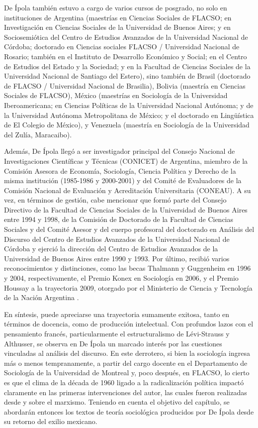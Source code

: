 {De Ípola también estuvo a cargo de varios cursos de posgrado, no solo en instituciones de Argentina (maestrías en Ciencias Sociales de FLACSO; en Investigación en Ciencias Sociales de la Universidad de Buenos Aires; y en Sociosemiótica del Centro de Estudios Avanzados de la Universidad Nacional de Córdoba; doctorado en Ciencias sociales FLACSO / Universidad Nacional de Rosario; también en el Instituto de Desarrollo Económico y Social; en el Centro de Estudios del Estado y la Sociedad; y en la Facultad de Ciencias Sociales de la Universidad Nacional de Santiago del Estero), sino también de Brasil (doctorado de FLACSO / Universidad Nacional de Brasilia), Bolivia (maestría en Ciencias Sociales de FLACSO), México (maestrías en Sociología de la Universidad Iberoamericana; en Ciencias Políticas de la Universidad Nacional Autónoma; y de la Universidad Autónoma Metropolitana de México; y el doctorado en Lingüística de El Colegio de México), y Venezuela (maestría en Sociología de la Universidad del Zulía, Maracaibo).

Además, De Ípola llegó a ser investigador principal del Consejo Nacional de Investigaciones Científicas y Técnicas (CONICET) de Argentina, miembro de la Comisión Asesora de Economía, Sociología, Ciencia Política y Derecho de la misma institución (1985-1986 y 2000-2001) y del Comité de Evaluadores de la Comisión Nacional de Evaluación y Acreditación Universitaria (CONEAU). A su vez, en términos de gestión, cabe mencionar que formó parte del Consejo Directivo de la Facultad de Ciencias Sociales de la Universidad de Buenos Aires entre 1994 y 1998, de la Comisión de Doctorado de la Facultad de Ciencias Sociales y del Comité Asesor y del cuerpo profesoral del doctorado en Análisis del Discurso del Centro de Estudios Avanzados de la Universidad Nacional de Córdoba y ejerció la dirección del Centro de Estudios Avanzados de la Universidad de Buenos Aires entre 1990 y 1993. Por último, recibió varios reconocimientos y distinciones, como las becas Thalmann y Guggenheim en 1996 y 2004, respectivamente, el Premio Konex en Sociología en 2006, y el Premio Houssay a la trayectoria 2009, otorgado por el Ministerio de Ciencia y Tecnología de la Nación Argentina \parencite{1608-DEIPOLA2010}.

En síntesis, puede apreciarse una trayectoria sumamente exitosa, tanto en términos de docencia, como de producción intelectual. Con profundos lazos con el pensamiento francés, particularmente el estructuralismo de Lévi-Strauss y Althusser, se observa en De Ípola un marcado interés por las cuestiones vinculadas al análisis del discurso. En este derrotero, si bien la sociología ingresa más o menos tempranamente, a partir del cargo docente en el Departamento de Sociología de la Universidad de Montreal y, poco después, en FLACSO, lo cierto es que el clima de la década de 1960 ligado a la radicalización política impactó claramente en las primeras intervenciones del autor, las cuales fueron realizadas desde y sobre el marxismo. Teniendo en cuenta el objetivo del capítulo, se abordarán entonces los textos de teoría sociológica producidos por De Ípola desde su retorno del exilio mexicano.

}
